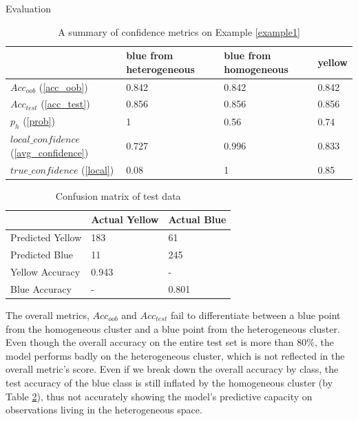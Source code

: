 \documentclass[12pt]{pom_thesis}
\begin{document}
\begin{chapter}{Evaluation}
\begin{table}[h]
    \centering
    \begin{tabular}{|l|l|l|l|}
    \hline
         & blue from heterogeneous & blue from homogeneous  & yellow \\
         \hline
         $Acc_{oob}$ (\ref{acc_oob}) & 0.842 & 0.842 & 0.842 \\
         \hline
         $Acc_{test}$ (\ref{acc_test})  & 0.856 & 0.856 & 0.856  \\
         \hline
         $p_h$ (\ref{prob})   & 1 & 0.56 & 0.74  \\
         \hline
         $local\_confidence$ (\ref{avg_confidence}) & 0.727 & 0.996 & 0.833  \\
         \hline
         $true\_confidence$ (\ref{local}) & 0.08 & 1 & 0.85   \\
         \hline 
         
    \end{tabular}
    \caption{A summary of confidence metrics on Example \ref{example1}}
    \label{table1}
\end{table}

\begin{table}[h]
    \centering
    
     \begin{tabular}{|l|l|l|}
    \hline
         & Actual Yellow & Actual Blue \\
         \hline
         Predicted Yellow & 183 & 61 \\
         \hline
         Predicted Blue &11 &245 \\
         \hline
         Yellow Accuracy & 0.943 &-\ \\
         \hline
         Blue Accuracy & - & 0.801 \\
         \hline
         
    \end{tabular}
    \caption{Confusion matrix of test data}
    \label{confusion matrix}
\end{table}
The overall metrics, $Acc_{oob}$ and $Acc_{test}$ fail to differentiate between a blue point from the homogeneous cluster and a blue point from the heterogeneous cluster. Even though the overall accuracy on the entire test set is more than 80\%, the model performs badly on the heterogeneous cluster, which is not reflected in the overall metric's score. Even if we break down the overall accuracy by class, the test accuracy of the blue class is still inflated by the homogeneous cluster (by Table \ref{confusion matrix}), thus not accurately showing the model's predictive capacity on observations living in the heterogeneous space.


\end{chapter}
\end{document}
